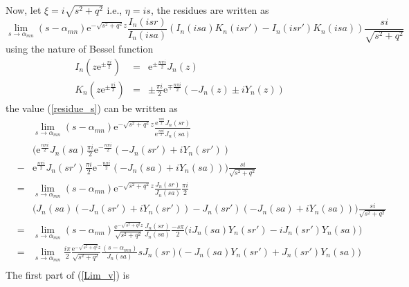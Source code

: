 \documentclass{article}
\begin{document}
Now, let $\xi = i\sqrt{s^2 + q^2}$ i.e., $\eta = is$, the residues are written as
\begin{equation}
    \lim_{s \to \alpha_{mn}}
    (s - \alpha_{mn})
    \mathrm{e}^{-\sqrt{s^2 + q^2} z}\frac{I_n(isr)}{I_n(isa)}
    \left(I_n(isa)K_n(isr') - I_n(isr')K_n(isa)\right)
    \frac{si}{\sqrt{s^2+q^2}} \label{residue_s}
\end{equation}
using the nature of Bessel function
\begin{eqnarray}
    I_n(z\mathrm{e}^{\pm\frac{\pi i}{2}}) &=& \mathrm{e}^{\pm\frac{n\pi i}{2}}J_n(z) \nonumber \\
    K_n(z\mathrm{e}^{\pm\frac{\pi i}{2}}) &=&
        \pm\frac{\pi i}{2}\mathrm{e}^{\mp\frac{n\pi i}{2}}(-J_n(z) \pm iY_n(z))
\end{eqnarray}
the value (\ref{residue_s}) can be written as
\begin{eqnarray}
    & & \lim_{s \to \alpha_{mn}}
        (s - \alpha_{mn})
        \mathrm{e}^{-\sqrt{s^2 + q^2} z}
        \frac{\mathrm{e}^{\frac{n\pi i}{2}}J_n(sr)}
        {\mathrm{e}^{\frac{n\pi i}{2}}J_n(sa)} \nonumber \\
    & & \Big(\mathrm{e}^{\frac{n\pi i}{2}}J_n(sa)
            \frac{\pi i}{2}\mathrm{e}^{-\frac{n\pi i}{2}}(-J_n(sr') + iY_n(sr')) \nonumber \\
    &-&     \mathrm{e}^{\frac{n\pi i}{2}}J_n(sr')
            \frac{\pi i}{2}\mathrm{e}^{-\frac{n\pi i}{2}}(-J_n(sa) + iY_n(sa))
        \Big) \frac{si}{\sqrt{s^2+q^2}}\nonumber \\
    &=& \lim_{s \to \alpha_{mn}}
        (s - \alpha_{mn})
        \mathrm{e}^{-\sqrt{s^2 + q^2} z}
        \frac{J_n(sr)}{J_n(sa)}\frac{\pi i}{2}\nonumber \\
    & & \Big(J_n(sa)(-J_n(sr') + iY_n(sr')) - J_n(sr')(-J_n(sa) + iY_n(sa))
        \Big) \frac{si}{\sqrt{s^2+q^2}}\nonumber \\
    &=& \lim_{s \to \alpha_{mn}}
        (s - \alpha_{mn})
        \frac{\mathrm{e}^{-\sqrt{s^2 + q^2} z}}{\sqrt{s^2+q^2}}
        \frac{J_n(sr)}{J_n(sa)}\frac{-s\pi}{2}\Big(iJ_n(sa)Y_n(sr') - iJ_n(sr')Y_n(sa)
        \Big)\nonumber \\
    &=& \lim_{s \to \alpha_{mn}}\frac{i\pi}{2}
        \frac{\mathrm{e}^{-\sqrt{s^2 + q^2} z}}{\sqrt{s^2+q^2}}
        \frac{(s - \alpha_{mn})}{J_n(sa)}sJ_n(sr)
        \Big(-J_n(sa)Y_n(sr') + J_n(sr')Y_n(sa)\Big)\nonumber \\
        \label{Lim_v}
\end{eqnarray}
The first part of (\ref{Lim_v}) is 
\end{document}
